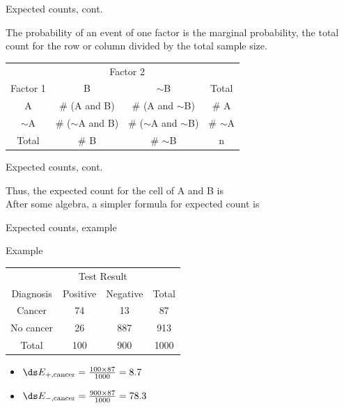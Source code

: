 \documentclass[xcolor=table, aspectratio=169, bigger]{beamer}
\begin{document}
\begin{frame}{Expected counts, cont.}
\begin{block}{}
The probability of an event of one factor is the marginal probability, the total count for the row or column divided by the total sample size.\\
\medskip
{\centering
\begin{tabular}{c | c  c | c}
\multicolumn{1}{c}{} & \multicolumn{2}{c}{Factor 2}\\
Factor 1 & B & $\sim$B & Total\\
\hline
A & \# (A and B) & \# (A and $\sim$B) & \# A\\
$\sim$A & \# ($\sim$A and B) & \# ($\sim$A and $\sim$B) & \# $\sim$A \\
\hline
Total & \# B & \# $\sim$B & n
\end{tabular}
\par}
\bigskip
{}

\smallskip
\end{block}
\end{frame}

\begin{frame}{Expected counts, cont.}
\begin{block}{}
Thus, the expected count for the cell of A and B is\\
\medskip
{}
\pause\bigskip
After some algebra, a simpler formula for expected count is\\
\medskip
{}
\medskip
\end{block}
\end{frame}

\begin{frame}{Expected counts, example}
\begin{exampleblock}{Example}
\smallskip
{\centering
\begin{tabular}{c | c  c | c}
\multicolumn{1}{c}{} & \multicolumn{2}{c}{Test Result}\\
Diagnosis & Positive & Negative & Total\\
\hline
Cancer & 74 & 13 & 87\\
No cancer & 26 & 887 & 913 \\
\hline
Total & 100 & 900 & 1000
\end{tabular}
\par}
\bigskip
\begin{itemize}
\pause\item $\ds E_{+,\text{cancer}} = \frac {100 \times 87}{1000} = 8.7$
\pause\item $\ds E_{-,\text{cancer}} = \frac {900 \times 87}{1000} = 78.3$
\end{itemize}
\smallskip
\end{exampleblock}
\end{frame}
\end{document}
